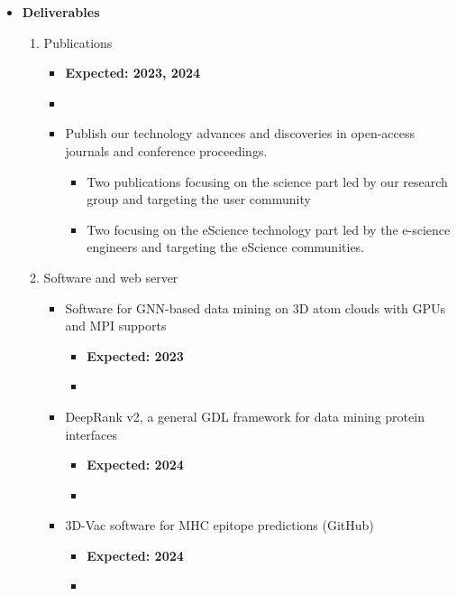 \begin{itemize}[leftmargin=0.27in,label={\bfseries {}}]
    \item \textbf{Deliverables}
    \begin{enumerate}[start=1,leftmargin=.7in,label={\ding{226} D\arabic*.}]
        \item Publications
        \begin{itemize}
            \item \textbf{Expected: 2023, 2024}
            \item {}
            \item Publish our technology advances and discoveries in open-access journals and conference proceedings.
            \begin{itemize}
                \item Two publications focusing on the science part led by our research group and targeting the user community
                \item Two focusing on the eScience technology part led by the e-science engineers and targeting the eScience communities.
            \end{itemize}
        \end{itemize}
        \item Software and web server
        \begin{itemize}
            \item Software for GNN-based data mining on 3D atom clouds with GPUs and MPI supports
            \begin{itemize}
                \item \textbf{Expected: 2023}
                \item {}
            \end{itemize}
            \item DeepRank v2, a general GDL framework for data mining protein interfaces
            \begin{itemize}
                \item \textbf{Expected: 2024}
                \item {}
            \end{itemize}
            \item 3D-Vac software for MHC epitope predictions (GitHub)
            \begin{itemize}
                \item \textbf{Expected: 2024}
                \item {}

\end{itemize}
\end{itemize}
\end{enumerate}
\end{itemize}
